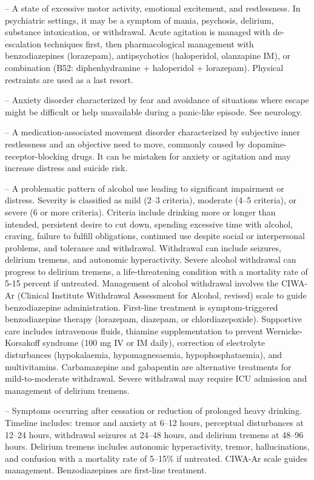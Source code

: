 -- A state of excessive motor activity, emotional excitement, and restlessness. In psychiatric settings, it may be a symptom of mania, psychosis, delirium, substance intoxication, or withdrawal. Acute agitation is managed with de-escalation techniques first, then pharmacological management with benzodiazepines (lorazepam), antipsychotics (haloperidol, olanzapine IM), or combination (B52: diphenhydramine + haloperidol + lorazepam). Physical restraints are used as a last resort.

-- Anxiety disorder characterized by fear and avoidance of situations where escape might be difficult or help unavailable during a panic-like episode. See neurology.

-- A medication-associated movement disorder characterized by subjective inner restlessness and an objective need to move, commonly caused by dopamine-receptor-blocking drugs. It can be mistaken for anxiety or agitation and may increase distress and suicide risk.


-- A problematic pattern of alcohol use leading to significant impairment or distress. Severity is classified as mild (2--3 criteria), moderate (4--5 criteria), or severe (6 or more criteria). Criteria include drinking more or longer than intended, persistent desire to cut down, spending excessive time with alcohol, craving, failure to fulfill obligations, continued use despite social or interpersonal problems, and tolerance and withdrawal. Withdrawal can include seizures, delirium tremens, and autonomic hyperactivity. Severe alcohol withdrawal can progress to delirium tremens, a life-threatening condition with a mortality rate of 5-15 percent if untreated. Management of alcohol withdrawal involves the CIWA-Ar (Clinical Institute Withdrawal Assessment for Alcohol, revised) scale to guide benzodiazepine administration. First-line treatment is symptom-triggered benzodiazepine therapy (lorazepam, diazepam, or chlordiazepoxide). Supportive care includes intravenous fluids, thiamine supplementation to prevent Wernicke-Korsakoff syndrome (100 mg IV or IM daily), correction of electrolyte disturbances (hypokalaemia, hypomagnesaemia, hypophosphataemia), and multivitamins. Carbamazepine and gabapentin are alternative treatments for mild-to-moderate withdrawal. Severe withdrawal may require ICU admission and management of delirium tremens.

-- Symptoms occurring after cessation or reduction of prolonged heavy drinking. Timeline includes: tremor and anxiety at 6--12 hours, perceptual disturbances at 12--24 hours, withdrawal seizures at 24--48 hours, and delirium tremens at 48--96 hours. Delirium tremens includes autonomic hyperactivity, tremor, hallucinations, and confusion with a mortality rate of 5--15\% if untreated. CIWA-Ar scale guides management. Benzodiazepines are first-line treatment.

